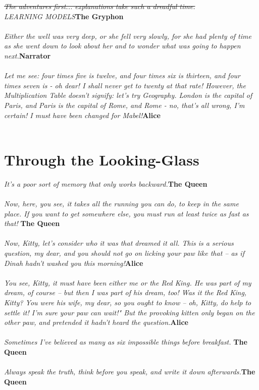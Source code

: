 \documentclass{hi-thesis}
\renewcommand{\quote}[2]{\noindent \emph{#2}\hfill{\bf #1}\\\\}
\begin{document}
\quote{The Gryphon}{\st{The adventures first... explanations take such a dreadful time.}\\LEARNING MODELS}
\quote{Narrator}{Either the well was very deep, or she fell very slowly, for she had plenty of time as she went down to look about her and to wonder what was going to happen next.}
\quote{Alice}{Let me see: four times five is twelve, and four times six is thirteen, and four times seven is - oh dear! I shall never get to twenty at that rate! However, the Multiplication Table doesn't signify: let's try Geography. London is the capital of Paris, and Paris is the capital of Rome, and Rome - no, that's all wrong, I'm certain! I must have been changed for Mabel!}



\chapter*{Through the Looking-Glass}
\quote{The Queen}{It's a poor sort of memory that only works backward.}
\quote{The Queen}{Now, here, you see, it takes all the running you can do, to keep in the same place. If you want to get somewhere else, you must run at least twice as fast as that! }
\quote{Alice}{Now, Kitty, let's consider who it was that dreamed it all. This is a serious question, my dear, and you should not go on licking your paw like that -- as if Dinah hadn't washed you this morning!}
\quote{Alice}{You see, Kitty, it must have been either me or the Red King. He was part of my dream, of course -- but then I was part of his dream, too! Was it the Red King, Kitty? You were his wife, my dear, so you ought to know -- oh, Kitty, do help to settle it! I'm sure your paw can wait!" But the provoking kitten only began on the other paw, and pretended it hadn't heard the question.}
\quote{The Queen}{Sometimes I've believed as many as six impossible things before breakfast. }
\quote{The Queen}{Always speak the truth, think before you speak, and write it down afterwards.}






\nocite{lookingglass,alice}
 

\end{document}

